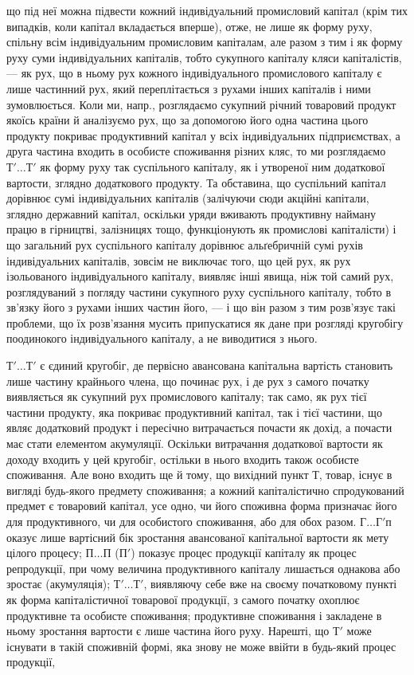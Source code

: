 \parcont{}  %
що під неї можна підвести кожний індивідуальний промисловий капітал (крім тих випадків, коли капітал
вкладається вперше), отже, не лише як форму руху, спільну всім індивідуальним промисловим капіталам,
але разом з тим і як форму руху суми індивідуальних капіталів, тобто сукупного капіталу кляси
капіталістів, — як рух, що в ньому рух кожного індивідуального промислового капіталу є лише
частинний рух, який переплітається з рухами інших капіталів і ними зумовлюється. Коли ми, напр.,
розглядаємо сукупний річний товаровий продукт якоїсь країни й аналізуємо рух, що за допомогою його
одна частина цього продукту покриває продуктивний капітал у всіх індивідуальних підприємствах, а
друга частина входить в особисте споживання різних кляс, то ми розглядаємо $Т'\dots{} Т'$ як форму руху
так суспільного капіталу, як і утвореної ним додаткової вартости, зглядно додаткового продукту. Та
обставина, що суспільний капітал дорівнює сумі індивідуальних капіталів (залічуючи сюди акційні
капітали, зглядно державний капітал, оскільки уряди вживають продуктивну найману працю в гірництві,
залізницях тощо, функціонують як промислові капіталісти) і що загальний рух суспільного капіталу
дорівнює альґебричній сумі рухів
індивідуальних капіталів, зовсім не виключає того, що цей рух, як рух ізольованого індивідуального
капіталу, виявляє інші явища, ніж той самий рух, розглядуваний з погляду частини сукупного руху
суспільного капіталу, тобто в зв’язку його з рухами інших частин його, — і що він разом з тим
розв’язує такі проблеми, що їх розв’язання мусить припускатися як дане при розгляді кругобігу
поодинокого індивідуального капіталу, а не виводитися з нього.

$Т'\dots{} Т'$ є єдиний кругобіг, де первісно авансована капітальна вартість становить лише частину
крайнього члена, що починає рух, і де рух з самого початку виявляється як сукупний рух промислового
капіталу; так само, як рух тієї частини продукту, яка покриває продуктивний капітал, так і тієї
частини, що являє додатковий продукт і пересічно витрачається почасти як дохід, а почасти має стати
елементом акумуляції. Оскільки витрачання додаткової вартости як доходу входить у цей кругобіг,
остільки в нього входить також особисте споживання. Але воно входить ще й тому, що вихідний пункт $Т$,
товар, існує в вигляді будь-якого предмету споживання; а кожний капіталістично спродукований предмет
є товаровий капітал, усе одно, чи його споживна форма призначає його для продуктивного, чи для
особистого споживання, або для обох разом. $Г\dots{} Г' п$оказує лише вартісний бік зростання авансованої
капітальної вартости як мету цілого процесу; $П\dots{} П$ ($П'$) показує процес продукції капіталу як процес
репродукції, при чому величина продуктивного капіталу лишається однакова або зростає (акумуляція);
$Т'\dots{} Т'$, виявляючу себе вже на своєму початковому пункті як форма капіталістичної товарової
продукції, з самого початку охоплює продуктивне та особисте споживання; продуктивне споживання і
закладене в ньому зростання вартости є лише частина його руху. Нарешті, що $Т'$ може існувати в такій
споживній формі, яка знову не може ввійти в будь-який процес продукції,
\parbreak{}  %

